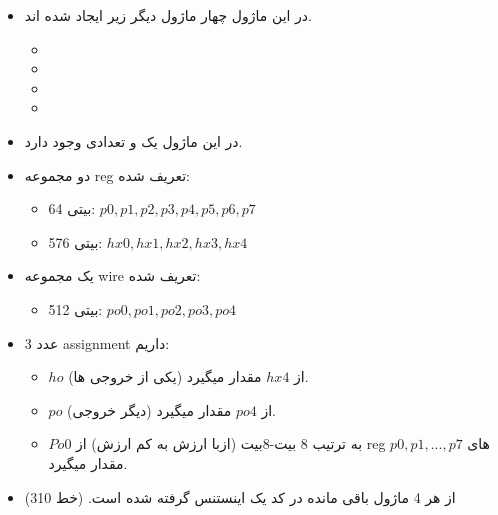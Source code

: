 \begin{itemize}
\item
در این ماژول چهار ماژول دیگر زیر ایجاد شده اند. 
\begin{itemize}
\item
{}
\item
{}
\item
{}
\item
{}
\end{itemize}
\item
در این ماژول یک 
و تعدادی 
وجود دارد.
\item
دو مجموعه reg تعریف شده:
\begin{itemize}
\item
64 بیتی: $p0, p1, p2, p3, p4, p5, p6, p7$
\item
576 بیتی: $hx0, hx1, hx2, hx3, hx4$
\end{itemize}
\item
یک مجموعه wire تعریف شده:
\begin{itemize}
\item
512 بیتی: $po0, po1, po2, po3, po4$
\end{itemize}
\item
3 عدد assignment داریم:
\begin{itemize}
\item
 $ho$ (یکی از خروجی ها) از $hx4$ مقدار میگیرد. 
 \item
$po$ (دیگر خروجی) از $po4$ مقدار میگیرد. 
\item
$Po0$ به ترتیب 8 بیت-8بیت (ازبا  ارزش به کم ارزش) از reg های $p0, p1, ..., p7$ مقدار میگیرد.
\end{itemize}
\item
از هر 4 ماژول باقی مانده
 در کد یک اینستنس گرفته شده است. (خط 310)
 

\end{itemize}
